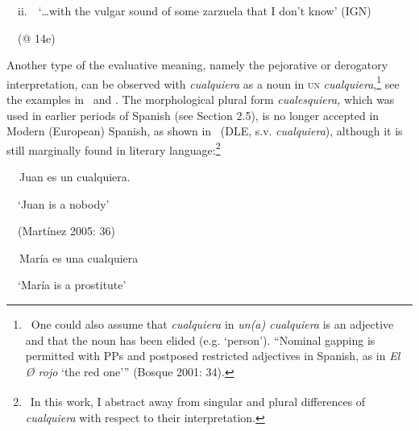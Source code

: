 \begin{styleStandard}
\ \ ii.\ \ ‘…with the vulgar sound of some zarzuela that I don’t know’ (IGN)
\end{styleStandard}

\begin{styleStandard}
\ \ (@ 14e)
\end{styleStandard}

\begin{styleStandard}
Another type of the evaluative meaning, namely the pejorative or derogatory interpretation, can be observed with \textit{cualquiera} as a noun in \textsc{un} \textit{cualquiera},\footnote{\textrm{\ One could also assume that }\textrm{\textit{cualquiera}}\textrm{ in }\textrm{\textit{un(a) cualquiera}}\textrm{ is an adjective and that the noun has been elided (e.g. ‘person’). “Nominal gapping is permitted with PPs and postposed restricted adjectives in Spanish, as in }\textrm{\textit{El Ø rojo}}\textrm{ ‘the red one’” (Bosque 2001: 34).}} see the examples in \ and . The morphological plural form \textit{cualesquiera,} which was used in earlier periods of Spanish (see Section 2.5), is no longer accepted in Modern (European) Spanish, as shown in \ (DLE, s.v. \textit{cualquiera}), although it is still marginally found in literary language:\footnote{\textrm{\textsuperscript{\ }}\textrm{In this work, I abstract away from singular and plural differences of }\textrm{\textit{cualquiera}}\textrm{ with respect to their interpretation. }}
\end{styleStandard}

\begin{styleStandard}
\label{bkm:Ref150778470}\textbf{\ \ }Juan es un cualquiera.
\end{styleStandard}

\begin{styleStandard}
\ \ ‘Juan is a nobody’ 
\end{styleStandard}

\begin{styleStandard}
\ \ (Martínez 2005: 36)
\end{styleStandard}

\begin{styleStandard}
\label{bkm:Ref150778472}\textbf{\ \ }María es una cualquiera
\end{styleStandard}

\begin{styleStandard}
\ \ ‘María is a prostitute’
\end{styleStandard}

